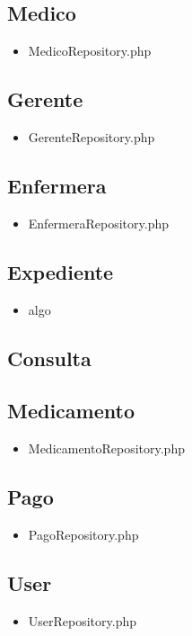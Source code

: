 		\subsection{Medico}
		\begin{itemize}
			\item MedicoRepository.php
		\end{itemize}
		\subsection{Gerente}
		\begin{itemize}
			\item GerenteRepository.php
		\end{itemize}
		\subsection{Enfermera}
		\begin{itemize}
			\item EnfermeraRepository.php
		\end{itemize}
		\subsection{Expediente}
		\begin{itemize}
			\item algo
		\end{itemize}
		\subsection{Consulta}
		
		\subsection{Medicamento}
		\begin{itemize}
		\item MedicamentoRepository.php
		\end{itemize}
		\subsection{Pago}
		\begin{itemize}
			\item PagoRepository.php
		\end{itemize}
		\subsection{User}
		\begin{itemize}
			\item UserRepository.php
		\end{itemize}%


